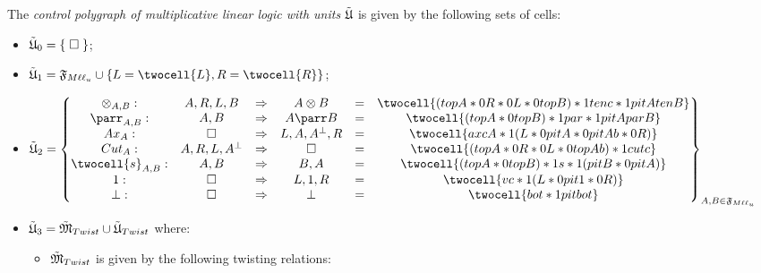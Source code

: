 \documentclass[a4paper]{article}
\begin{document}
\begin{definition}
The \emph{control polygraph of multiplicative linear logic with units} ${\tilde{\mathfrak{U}}}$ is given by the following sets of cells:
\begin{multicols}{2}
\begin{itemize}
\item ${\tilde{\mathfrak{U}}}_0=\{\; \square \;\}$;
\item $\Mlltc_1= \fmllc \cup \{L=\twocell{L},R=\twocell{R}\}$;
\end{itemize}
\end{multicols}
\begin{itemize}
\item %
{$\Mlltc_2=\begin{Bmatrix}
\otimes_{A,B}: &  A ,R,L, B &\frr & A\otimes B &=& \twocell{(topA *0 R *0 L *0 topB)*1 tenc *1 pitAtenB}\\
\parr_{A,B}: &  A , B &\frr & A\parr B  &=& \twocell{(topA *0 topB )*1 par *1 pitAparB}\\
Ax_A: & \pro &\frr &L, A , A^\bot,R &=& \twocell{axcA*1 (L*0 pitA *0 pitAb*0 R)} \\
Cut_A: &  A ,R,L, A^\bot &\frr & \pro  &=& \twocell{(topA *0 R *0 L *0 topAb)*1 cutc}\\ 
\twocell{s}_{A,B}: &  A ,B &\frr & B , A &=& \twocell{(topA *0 topB) *1 s *1 (pitB *0 pitA)}\\
1: & \pro &\frr &L, 1,R  &=&\twocell{vc *1 (L *0 pit1 *0 R)}\\
\bot: & \pro &\frr &\bot  &=& \twocell{bot *1 pitbot} \\
\end{Bmatrix}_{A,B\in \fmllc}$
}%
\item ${\tilde{\mathfrak{U}}}_3= \tilde{\mathfrak{M}}_{Twist}\cup {\tilde{\mathfrak{U}}}_{Twist}$ where:

\begin{itemize}
\item $\tilde{\mathfrak{M}}_{Twist}$  is given by the  following twisting relations:
\end{itemize}
\begin{center}\end{center}


\end{itemize}
\end{definition}
\end{document}
